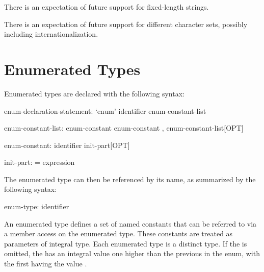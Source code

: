 \begin{openissue}
There is an expectation of future support for fixed-length strings.
\end{openissue}

\begin{openissue}
There is an expectation of future support for different character
sets, possibly including internationalization.
\end{openissue}

\section{Enumerated Types}
\label{Enumerated_Types}

Enumerated types are declared with the following syntax:

\begin{syntax}
enum-declaration-statement:
  `enum' identifier { enum-constant-list }

enum-constant-list:
  enum-constant
  enum-constant , enum-constant-list[OPT]

enum-constant:
  identifier init-part[OPT]

init-part:
  = expression
\end{syntax}

The enumerated type can then be referenced by its name, as summarized
by the following syntax:

\begin{syntax}
enum-type:
  identifier
\end{syntax}

An enumerated type defines a set of named constants that can be
referred to via a member access on the enumerated type.
These constants are treated as parameters of integral type.  Each
enumerated type is a distinct type. If the  is
omitted, the  has an integral value one higher
than the previous  in the enum, with the first
having the value .

